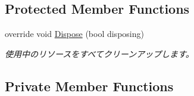 \subsection*{Protected Member Functions}
\begin{DoxyCompactItemize}
\item 
override void \hyperlink{class_reversi_form_1_1_reversi_ac021c14c28e588c11445e460ec7e87d1}{Dispose} (bool disposing)
\begin{DoxyCompactList}\small\item\em 使用中のリソースをすべてクリーンアップします。 \end{DoxyCompactList}\end{DoxyCompactItemize}
\subsection*{Private Member Functions}
